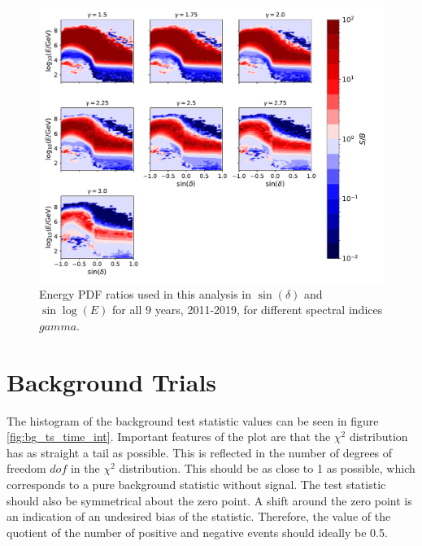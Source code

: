 \begin{figure}
    \centering
    \includegraphics[width=\linewidth]{Plots/05_csky/energy_pdf_ratio.pdf}
    \caption{Energy PDF ratios used in this analysis in $\sin{(\delta)}$ and $\sin{\log{(E)}}$ for all $\num{9}$ years, 2011-2019, for different spectral indices $gamma$.}
\end{figure}

\section{Background Trials}

The histogram of the background test statistic values can be seen in figure \ref{fig:bg_ts_time_int}.
Important features of the plot are that the $\chi^2$ distribution has as straight a tail as possible.
This is reflected in the number of degrees of freedom $dof$ in the $\chi^2$ distribution.
This should be as close to 1 as possible, which corresponds to a pure background statistic without signal.
The test statistic should also be symmetrical about the zero point.
A shift around the zero point is an indication of an undesired bias of the statistic.
Therefore, the value of the quotient of the number of positive and negative events should ideally be 0.5.

